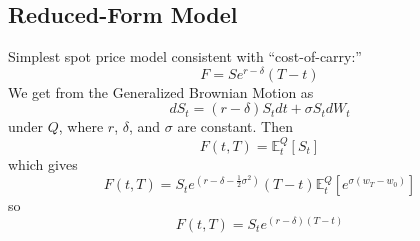 \subsection{Reduced-Form Model}
Simplest spot price model consistent with ``cost-of-carry:''
\begin{equation}
	F = S e^{r-\delta}(T-t)
\end{equation}
We get from the Generalized Brownian Motion as
\begin{equation}
	dS_t = (r-\delta)S_t dt + \sigma S_t dW_t
\end{equation}
under $Q$, where $r$, $\delta$, and $\sigma$ are constant. Then
\begin{equation}
	F(t,T) = \mathbb{E}_t^Q\left[ S_t \right]
\end{equation}
which gives
\begin{equation}
	F(t,T ) = S_t e^(r-\delta - \frac12 \sigma^2)(T-t)\mathbb{E}_t^Q\left[ e^{\sigma(w_T-w_0)} \right]
\end{equation}
so 
\begin{equation}
	F(t,T) = S_t e^{(r-\delta)(T-t)}
\end{equation}

